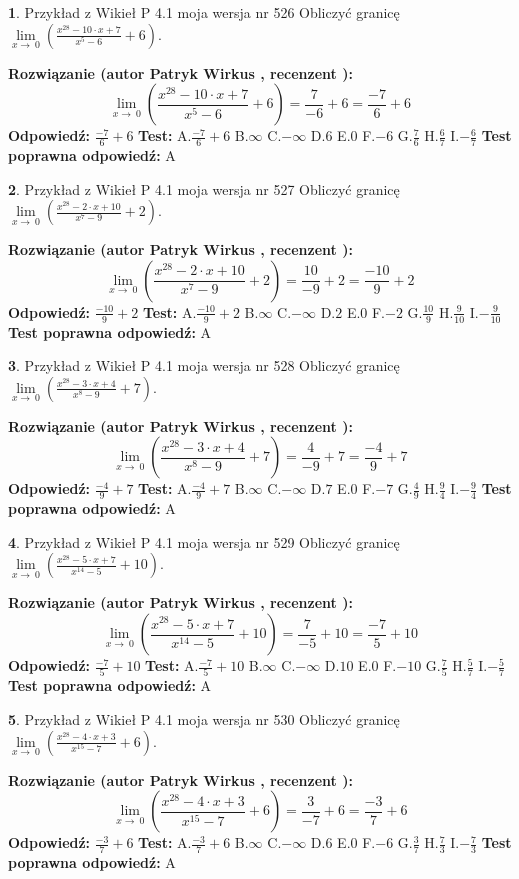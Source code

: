\documentclass[12pt, a4paper]{article}
\theoremstyle{definition} %
\newtheorem{zad}{}
\newcommand{\zadStart}[1]{\begin{zad}#1\newline}
\newcommand{\zadStop}{\end{zad}}
\newcommand{\rozwStart}[2]{\noindent \textbf{Rozwiązanie (autor #1 , recenzent #2): }\newline}
\newcommand{\rozwStop}{\newline}
\newcommand{\odpStart}{\noindent \textbf{Odpowiedź:}\newline}
\newcommand{\odpStop}{\newline}
\newcommand{\testStart}{\noindent \textbf{Test:}\newline}
\newcommand{\testStop}{\newline}
\newcommand{\kluczStart}{\noindent \textbf{Test poprawna odpowiedź:}\newline}
\newcommand{\kluczStop}{\newline}
\begin{document}
\zadStart{Przykład z Wikieł P 4.1 moja wersja nr 526}
Obliczyć granicę $\lim\limits_{x\to\ 0}(\frac{x^{28}-10 \cdot x +7}{x^{5}-6}+6)$.
\zadStop
\rozwStart{Patryk Wirkus}{}
$$\lim\limits_{x\to\ 0}(\frac{x^{28}-10 \cdot x +7}{x^{5}-6}+6)=\frac{7}{-6}+6=\frac{-7}{6}+6$$
\rozwStop
\odpStart
$\frac{-7}{6}+6$
\odpStop
\testStart
A.$\frac{-7}{6}+6$
B.$\infty$
C.$-\infty$
D.$6$
E.$0$
F.$-6$
G.$\frac{7}{6}$
H.$\frac{6}{7}$
I.$-\frac{6}{7}$
\testStop
\kluczStart
A
\kluczStop



\zadStart{Przykład z Wikieł P 4.1 moja wersja nr 527}
Obliczyć granicę $\lim\limits_{x\to\ 0}(\frac{x^{28}-2 \cdot x +10}{x^{7}-9}+2)$.
\zadStop
\rozwStart{Patryk Wirkus}{}
$$\lim\limits_{x\to\ 0}(\frac{x^{28}-2 \cdot x +10}{x^{7}-9}+2)=\frac{10}{-9}+2=\frac{-10}{9}+2$$
\rozwStop
\odpStart
$\frac{-10}{9}+2$
\odpStop
\testStart
A.$\frac{-10}{9}+2$
B.$\infty$
C.$-\infty$
D.$2$
E.$0$
F.$-2$
G.$\frac{10}{9}$
H.$\frac{9}{10}$
I.$-\frac{9}{10}$
\testStop
\kluczStart
A
\kluczStop



\zadStart{Przykład z Wikieł P 4.1 moja wersja nr 528}
Obliczyć granicę $\lim\limits_{x\to\ 0}(\frac{x^{28}-3 \cdot x +4}{x^{8}-9}+7)$.
\zadStop
\rozwStart{Patryk Wirkus}{}
$$\lim\limits_{x\to\ 0}(\frac{x^{28}-3 \cdot x +4}{x^{8}-9}+7)=\frac{4}{-9}+7=\frac{-4}{9}+7$$
\rozwStop
\odpStart
$\frac{-4}{9}+7$
\odpStop
\testStart
A.$\frac{-4}{9}+7$
B.$\infty$
C.$-\infty$
D.$7$
E.$0$
F.$-7$
G.$\frac{4}{9}$
H.$\frac{9}{4}$
I.$-\frac{9}{4}$
\testStop
\kluczStart
A
\kluczStop



\zadStart{Przykład z Wikieł P 4.1 moja wersja nr 529}
Obliczyć granicę $\lim\limits_{x\to\ 0}(\frac{x^{28}-5 \cdot x +7}{x^{14}-5}+10)$.
\zadStop
\rozwStart{Patryk Wirkus}{}
$$\lim\limits_{x\to\ 0}(\frac{x^{28}-5 \cdot x +7}{x^{14}-5}+10)=\frac{7}{-5}+10=\frac{-7}{5}+10$$
\rozwStop
\odpStart
$\frac{-7}{5}+10$
\odpStop
\testStart
A.$\frac{-7}{5}+10$
B.$\infty$
C.$-\infty$
D.$10$
E.$0$
F.$-10$
G.$\frac{7}{5}$
H.$\frac{5}{7}$
I.$-\frac{5}{7}$
\testStop
\kluczStart
A
\kluczStop



\zadStart{Przykład z Wikieł P 4.1 moja wersja nr 530}
Obliczyć granicę $\lim\limits_{x\to\ 0}(\frac{x^{28}-4 \cdot x +3}{x^{15}-7}+6)$.
\zadStop
\rozwStart{Patryk Wirkus}{}
$$\lim\limits_{x\to\ 0}(\frac{x^{28}-4 \cdot x +3}{x^{15}-7}+6)=\frac{3}{-7}+6=\frac{-3}{7}+6$$
\rozwStop
\odpStart
$\frac{-3}{7}+6$
\odpStop
\testStart
A.$\frac{-3}{7}+6$
B.$\infty$
C.$-\infty$
D.$6$
E.$0$
F.$-6$
G.$\frac{3}{7}$
H.$\frac{7}{3}$
I.$-\frac{7}{3}$
\testStop
\kluczStart
A
\kluczStop
\end{document}
